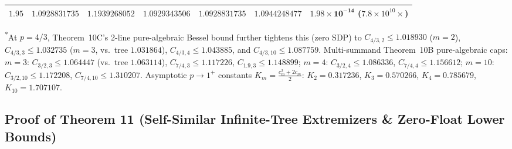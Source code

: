 \documentclass[10pt,letterpaper]{article}
\begin{document}
\begin{table}[htbp]
\begin{tabular}{@{}c l l l l l c@{}}
$1.95$ & $1.0928831735$ & $1.1939268052$ & $1.0929343506$ & $\mathbf{1.0928831735}$ & $1.0944248477$ & $\mathbf{1.98\times 10^{-14}}$ ($7.8\times 10^{10}\times$) \\
\bottomrule
\end{tabular}
\vspace{4pt}
\par\parbox{0.96\textwidth}{\footnotesize\textsuperscript{*}At $p = 4/3$, Theorem~10C's 2-line pure-algebraic Bessel bound further tightens this (zero SDP) to $C_{4/3,2} \le 1.018930$ ($m = 2$), $C_{4/3,3} \le 1.032735$ ($m = 3$, vs.\ tree $1.031864$), $C_{4/3,4} \le 1.043885$, and $C_{4/3,10} \le 1.087759$. Multi-summand Theorem~10B pure-algebraic caps: $m = 3$: $C_{3/2,3} \le 1.064447$ (vs.\ tree $1.063114$), $C_{7/4,3} \le 1.117226$, $C_{1.9,3} \le 1.148899$; $m = 4$: $C_{3/2,4} \le 1.086336$, $C_{7/4,4} \le 1.156612$; $m = 10$: $C_{3/2,10} \le 1.172208$, $C_{7/4,10} \le 1.310207$. Asymptotic $p \to 1^+$ constants $K_m = \frac{c_m^2+2c_m}{2}$: $K_2 = 0.317236$, $K_3 = 0.570266$, $K_4 = 0.785679$, $K_{10} = 1.707107$.}
\label{tab:thm10}
\end{table}

\subsection{Proof of Theorem 11 (Self-Similar Infinite-Tree Extremizers \& Zero-Float Lower Bounds)}
\end{document}
